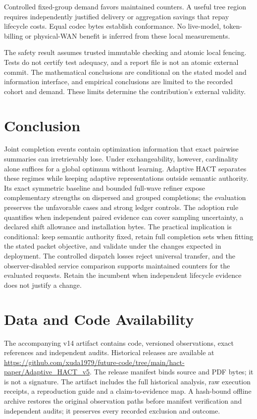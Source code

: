 \documentclass[preprint,12pt]{elsarticle}
\theoremstyle{definition}\newtheorem{definition}[theorem]{Definition}
\begin{document}
Controlled fixed-group demand favors maintained counters. A useful tree
region requires independently justified delivery or aggregation savings
that repay lifecycle costs. Equal codec bytes establish conformance.
No live-model, token-billing or physical-WAN benefit is inferred from
these local measurements.

The safety result assumes trusted immutable checking and atomic local
fencing. Tests do not certify test adequacy, and a report file is not an
atomic external commit. The mathematical conclusions are conditional on the stated model and
information interface, and empirical conclusions are limited to the recorded
cohort and demand. These limits determine the contribution's external validity.

\section{Conclusion}
Joint completion events contain optimization information that exact pairwise
summaries can irretrievably lose. Under exchangeability, however, cardinality
alone suffices for a global optimum without learning. Adaptive HACT separates
these regimes while keeping adaptive representations outside semantic
authority. Its exact symmetric baseline and bounded full-wave refiner expose
complementary strengths on dispersed and grouped completions; the evaluation
preserves the unfavorable cases and strong ledger controls.
The adoption rule quantifies when independent paired evidence can cover
sampling uncertainty, a declared shift allowance and installation bytes.
The practical implication is conditional: keep semantic authority fixed,
retain full completion sets when fitting the stated packet objective, and
validate under the changes expected in deployment. The controlled dispatch
losses reject universal transfer, and the observer-disabled service comparison
supports maintained counters for the evaluated requests. Retain the incumbent
when independent lifecycle evidence does not justify a change.

\section*{Data and Code Availability}
The accompanying v14 artifact contains code, versioned observations,
exact references and independent audits. Historical releases are available at
\url{https://github.com/xuda1979/future-code/tree/main/hact-paper/Adaptive_HACT_v5}.
The release manifest binds source and PDF bytes; it is not a signature.
The artifact includes the full historical analysis, raw execution receipts,
a reproduction guide and a claim-to-evidence map. A hash-bound offline
archive restores the original observation paths before manifest verification
and independent audits; it preserves every recorded exclusion and outcome.
\end{document}
